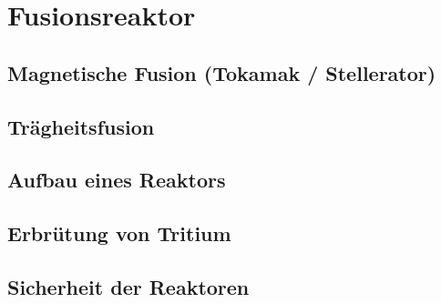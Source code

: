 \documentclass[10pt,a4paper, ngerman]{beamer}
\begin{document}
\section{Fusionsreaktor}
\subsection[Magnetische Fusion]{Magnetische Fusion (Tokamak / Stellerator)}
\begin{frame}{\subsecname}{\secname}

\end{frame}

\subsection{Trägheitsfusion}
\begin{frame}{\subsecname}{\secname}

\end{frame}

\subsection{Aufbau eines Reaktors}
\begin{frame}{\subsecname}{\secname}

\end{frame}

\subsection{Erbrütung von Tritium}
\begin{frame}{\subsecname}{\secname}

\end{frame}

\subsection{Sicherheit der Reaktoren}
\begin{frame}{\subsecname}{\secname}

\end{frame}



\begin{frame}
\titlepage
\end{frame}
\end{document}
